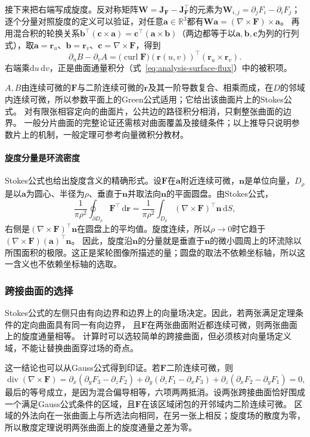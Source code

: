 接下来把右端写成旋度。反对称矩阵$\bm W=\bm J_{\bm F}-\bm J_{\bm F}^\top$的元素为$\bm W_{i,j}=\partial_jF_i-\partial_iF_j$；逐个分量对照旋度的定义可以验证，对任意$\bm a\in\mathbb R^3$都有$\bm W\bm a=(\nabla\times\bm F)\times\bm a$。
再用混合积的轮换关系$\bm b^\top(\bm c\times\bm a)=\bm c^\top(\bm a\times\bm b)$（两边都等于以$\bm a,\bm b,\bm c$为列的行列式），取$\bm a=\bm r_u$、$\bm b=\bm r_v$、$\bm c=\nabla\times\bm F$，得到
\[
 \partial_uB-\partial_vA
 =\bigl(\operatorname{curl}\bm F\bigr)(\bm r(u,v))^\top
   (\bm r_u\times\bm r_v).
\]
右端乘$\mathrm du\,\mathrm dv$，正是曲面通量积分（式~\eqref{eq:analysis-surface-flux}）中的被积项。

$A,B$由连续可微的$\bm F$与二阶连续可微的$\bm r$及其一阶导数复合、相乘而成，在$D$的邻域内连续可微，所以参数平面上的Green公式适用；它给出该曲面片上的Stokes公式。
对有限张相容定向的曲面片，公共边的路径积分相消，只剩整张曲面的边界。
一般分片曲面的完整论证还需核对曲面覆盖及接缝条件；以上推导只说明参数片上的机制，一般定理可参考向量微积分教材。

\paragraph{旋度分量是环流密度}

Stokes公式也给出旋度含义的精确形式。设$\bm F$在$\bm a$附近连续可微，$\bm n$是单位向量，$D_\rho$是以$\bm a$为圆心、半径为$\rho$、垂直于$\bm n$并取法向$\bm n$的平面圆盘。由Stokes公式，
\[
 \frac1{\pi\rho^2}\oint_{\partial D_\rho}\bm F^\top\,\mathrm d\bm r
 =\frac1{\pi\rho^2}\int_{D_\rho}(\nabla\times\bm F)^\top\bm n\,\mathrm dS,
\]
右侧是$(\nabla\times\bm F)^\top\bm n$在圆盘上的平均值。旋度连续，所以$\rho\to0$时它趋于$(\nabla\times\bm F)(\bm a)^\top\bm n$。
因此，旋度沿$\bm n$的分量就是垂直于$\bm n$的微小圆周上的环流除以所围面积的极限。这正是桨轮图像所描述的量；圆盘的取法不依赖坐标轴，所以这一含义也不依赖坐标轴的选取。

\subsubsection{跨接曲面的选择}

Stokes公式的左侧只由有向边界和边界上的向量场决定。因此，若两张满足定理条件的定向曲面具有同一有向边界，
且$\bm F$在两张曲面附近都连续可微，则两张曲面上的旋度通量相等。
计算时可以选较简单的跨接曲面，但必须核对向量场定义域，不能让替换曲面穿过场的奇点。

这一结论也可以从Gauss公式得到印证。若$\bm F$二阶连续可微，则
\[
 \operatorname{div}(\nabla\times\bm F)
 =\partial_x(\partial_yF_3-\partial_zF_2)
 +\partial_y(\partial_zF_1-\partial_xF_3)
 +\partial_z(\partial_xF_2-\partial_yF_1)=0,
\]
最后的等号成立，是因为混合偏导相等，六项两两抵消。设两张跨接曲面恰好围成一个满足Gauss公式条件的区域，且$\bm F$在该区域闭包的开邻域内二阶连续可微。
区域的外法向在一张曲面上与所选法向相同，在另一张上相反；旋度场的散度为零，所以散度定理说明两张曲面上的旋度通量之差为零。

